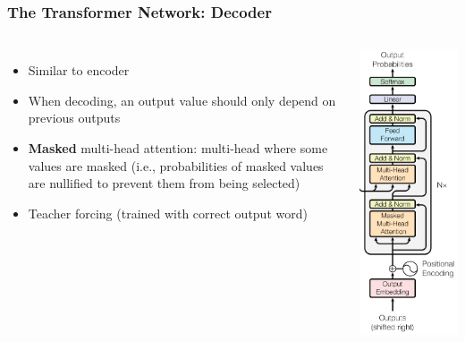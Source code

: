 \documentclass[10pt]{beamer}
\begin{document}
\begin{frame}
  \frametitle{The Transformer Network: Decoder}
  \begin{columns}
\begin{itemize}
\setlength\itemsep{.8em}
\item Similar to encoder
\item When decoding, an output value should only depend on previous outputs
\item \textbf{Masked} multi-head attention: multi-head where some values are 
masked (i.e., probabilities of masked values are nullified to prevent them from being selected)
\item Teacher forcing (trained with correct output word)
\end{itemize}
\begin{center}
	\includegraphics[width=.68\columnwidth]{images/dec}

\end{center}
\end{columns}
\end{frame}
\end{document}
